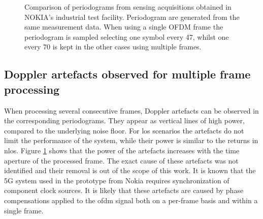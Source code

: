 \begin{figure}[b!]
{			}\hfill
			\caption[]{\small Comparison of periodograms from sensing acquisitions obtained in NOKIA's industrial test facility.
				Periodogram are generated from the same measurement data. When using a single OFDM frame the periodogram is sampled selecting one symbol every 47, whilst one every 70 is kept in the other cases using multiple frames.  }
			\label{fig:TDD_artefacts}
		\end{figure}
		
	\subsection{Doppler artefacts observed for multiple frame processing}

		When processing several consecutive frames, Doppler artefacts can be observed in the corresponding periodograms.
		They appear as vertical lines of high power, compared to the underlying noise floor.
		For \gls{los} scenarios the artefacts do not limit the performance of the system, while their power is similar to the returns in \gls{nlos}.
		Figure \ref{fig:TDD_artefacts} shows that the power of the artefacts increases with the time aperture of the processed frame.
		The exact cause of these artefacts was not identified and their removal is out of the scope of this work. It is known that the 5G system used in the prototype from Nokia requires synchronization of component clock sources.
		It is likely that these artefacts are caused by phase compensations applied to the \gls{ofdm} signal both on a per-frame basis and within a single frame.
		
		
		
